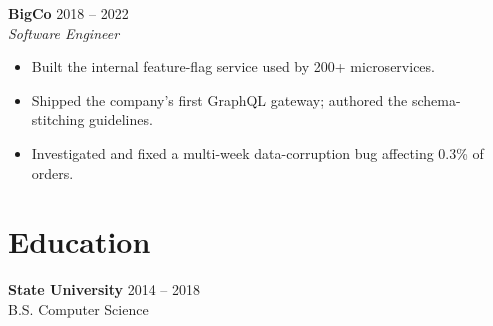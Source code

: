 \documentclass[11pt,a4paper]{article}
\begin{document}
\textbf{BigCo} \hfill 2018 -- 2022 \\
\textit{Software Engineer}
\begin{itemize}
  \item Built the internal feature-flag service used by 200+ microservices.
  \item Shipped the company's first GraphQL gateway; authored the schema-stitching guidelines.
  \item Investigated and fixed a multi-week data-corruption bug affecting 0.3\% of orders.
\end{itemize}

\section*{Education}

\textbf{State University} \hfill 2014 -- 2018 \\
B.S. Computer Science
\end{document}
